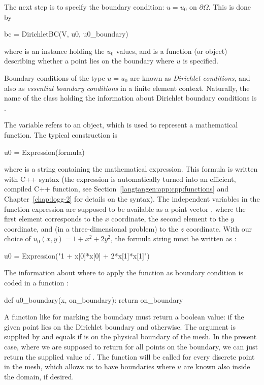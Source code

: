 The next step is to specify the boundary condition:
$u=u_0$ on $\partial\Omega$. This is done
by
\begin{python}
bc = DirichletBC(V, u0, u0_boundary)
\end{python}
where  is an instance holding the $u_0$ values, and
 is a function (or object) describing whether a point
lies on the boundary where $u$ is specified.

Boundary conditions of the type $u=u_0$ are known as \emph{Dirichlet
conditions}, and also as \emph{essential boundary conditions} in a finite
element context.  Naturally, the name of the \dolfin{} class holding the
information about Dirichlet boundary conditions is .

The  variable refers to an  object, which is
used to represent a mathematical function. The typical construction is
\begin{python}
u0 = Expression(formula)
\end{python}
where  is a string containing the mathematical
expression.  This formula is written with C++ syntax (the expression
is automatically turned into an efficient, compiled C++ function, see
Section~\ref{langtangen:app:cpp:functions} and Chapter~\ref{chap:logg-2}
for details on the syntax). The
independent variables in the function expression are supposed to be
available as a point vector , where the first element 
corresponds to the $x$ coordinate, the second element  to
the $y$ coordinate, and (in a three-dimensional problem) 
to the $z$ coordinate. With our choice of $u_0(x,y)=1 + x^2 + 2y^2$,
the formula string must be written as :
\begin{python}
u0 = Expression("1 + x[0]*x[0] + 2*x[1]*x[1]")
\end{python}

The information about where to apply the  function as boundary
condition is coded in a function :
\begin{python}
def u0_boundary(x, on_boundary):
    return on_boundary
\end{python}
A function like  for marking the boundary must return
a boolean value:  if the given point  lies on the Dirichlet
boundary and  otherwise.  The argument 
is supplied by \dolfin{} and equals
 if  is on the physical boundary of the mesh.
In the present case, where we are supposed to return  for all
points on the boundary, we can just return the supplied value of
.  The
 function will be called for every discrete point in
the mesh, which allows us to have boundaries where $u$ are known also
inside the domain, if desired.


